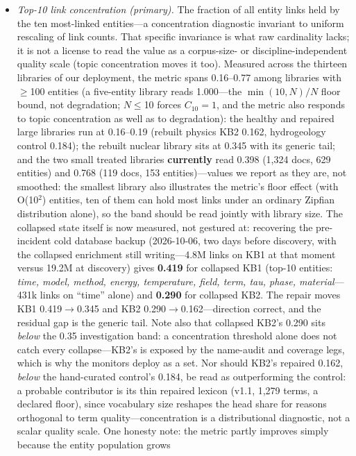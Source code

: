 \documentclass[preprint,12pt]{elsarticle}
\begin{document}
\begin{itemize}
\item[(a)] \emph{Top-10 link concentration (primary).}
The fraction of all entity links held by the ten most-linked entities---a
concentration diagnostic invariant to uniform rescaling of link counts.
That specific invariance is what raw cardinality lacks; it is not a
license to read the value as a corpus-size- or discipline-independent
quality scale (topic concentration moves it too). Measured across the thirteen libraries of
our deployment, the metric spans 0.16--0.77 among libraries with
$\geq$100 entities (a five-entity library reads 1.000---the
$\min(10,N)/N$ floor bound, not degradation; $N\leq$10 forces
$C_{10}{=}1$, and the metric also responds to topic concentration as
well as to degradation): the healthy and repaired
large libraries run at 0.16--0.19 (rebuilt physics KB2 0.162, hydrogeology
control 0.184); the rebuilt nuclear library sits at 0.345 with its generic
tail; and the two small treated libraries \textbf{currently} read 0.398
(1{,}324 docs, 629 entities) and 0.768 (119 docs, 153
entities)---values we report as they are, not smoothed: the smallest
library also illustrates the metric's floor effect (with O(10$^2$)
entities, ten of them can hold most links under an ordinary Zipfian
distribution alone), so the band should be read jointly with library
size. The collapsed state itself is now measured, not gestured at:
recovering the pre-incident cold database backup (2026-10-06, two days
before discovery, with the collapsed enrichment still writing---4.8M
links on KB1 at that moment versus 19.2M at discovery) gives
\textbf{0.419} for collapsed KB1 (top-10 entities: \emph{time, model,
method, energy, temperature, field, term, tau, phase, material}---431k
links on ``time'' alone) and \textbf{0.290} for collapsed KB2. The
repair moves KB1 0.419$\to$0.345 and KB2 0.290$\to$0.162---direction
correct, and the residual gap is the generic tail. Note also that
collapsed KB2's 0.290 sits \emph{below} the 0.35 investigation band: a
concentration threshold alone does not catch every collapse---KB2's is
exposed by the name-audit and coverage legs, which is why the monitors
deploy as a set. Nor should KB2's repaired 0.162, \emph{below} the
hand-curated control's 0.184, be read as outperforming the control:
a probable contributor is its thin repaired lexicon (v1.1, 1{,}279
terms, a declared floor), since vocabulary size reshapes the head
share for reasons orthogonal to term quality---concentration is a
distributional diagnostic, not a scalar quality scale. One honesty note:
the metric partly improves simply because the entity population grows

\end{itemize}
\end{document}
